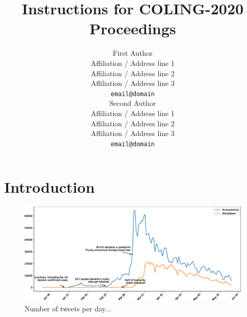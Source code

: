 \documentclass[11pt]{article}
\title{Instructions for COLING-2020 Proceedings}
\author{First Author \\
  Affiliation / Address line 1 \\
  Affiliation / Address line 2 \\
  Affiliation / Address line 3 \\
  {\tt email@domain} \\\And
  Second Author \\
  Affiliation / Address line 1 \\
  Affiliation / Address line 2 \\
  Affiliation / Address line 3 \\
  {\tt email@domain} \\}
\date{}
\begin{document}
\maketitle
\begin{abstract}
\end{abstract}

%
% 

\section{Introduction}
\label{sec:intro}
\begin{center}
\begin{figure}[!ht]
  \includegraphics[width=\textwidth]{images/finalcountgraph1.eps}
  \caption{Number of tweets per day...}
  \label{fig:1}
\end{figure}
\end{center}
\newpage
\end{document}
